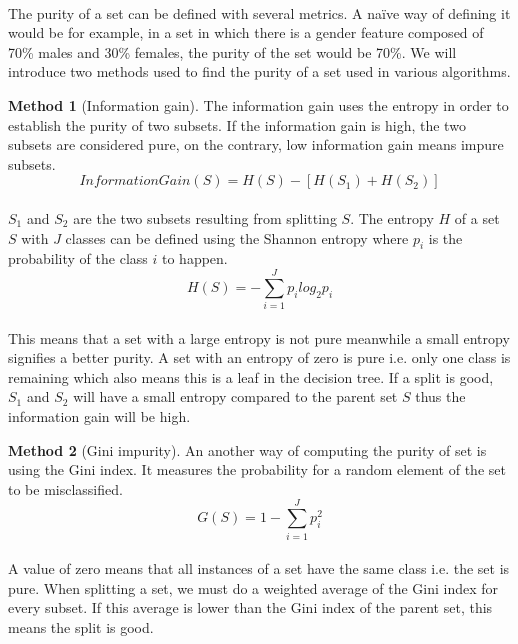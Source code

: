 \documentclass[12pt]{report}
\theoremstyle{definition}
\theoremstyle{definition}
\theoremstyle{definition}
\newtheorem*{method}{Method}
\begin{document}
\paragraph{} The purity of a set can be defined with several metrics. A naïve way of defining it would be for
example, in a set in which there is a gender feature composed of 70\% males and 30\% females, the purity of
the set would be 70\%. We will introduce two methods used to find the purity of a set used in various algorithms.

\begin{method}[Information gain]
    The information gain uses the entropy in order to establish the purity of two subsets. If the information
    gain is high, the two subsets are considered pure, on the contrary, low information gain means impure
    subsets.
    \begin{displaymath}
        InformationGain(S) = H(S) - [H(S_1) + H(S_2)]
    \end{displaymath}
    \paragraph{} $S_1$ and $S_2$ are the two subsets resulting from splitting $S$. The entropy $H$ of a set $S$
    with $J$ classes can be defined using the Shannon entropy where $p_i$ is the probability of the class $i$
    to happen.
    \begin{displaymath}
        H(S) = - \sum_{i=1}^{J} p_i log_2 p_i
    \end{displaymath}
    \paragraph{} This means that a set with a large entropy is not pure meanwhile a small entropy signifies a
    better purity. A set with an entropy of zero is pure i.e. only one class is remaining which also means this
    is a leaf in the decision tree. If a split is good, $S_1$ and $S_2$ will have a small entropy compared to the
    parent set $S$ thus the information gain will be high.
\end{method}

\begin{method}[Gini impurity]
    An another way of computing the purity of set is using the Gini index. It measures the probability for a
    random element of the set to be misclassified.
    \begin{displaymath}
        G(S) = 1 - \sum_{i=1}^{J} p_i^2
    \end{displaymath}
    \paragraph{} A value of zero means that all instances of a set have the same class i.e. the set is pure.
    When splitting a set, we must do a weighted average of the Gini index for every subset. If this average is
    lower than the Gini index of the parent set, this means the split is good.
\end{method}
\end{document}
